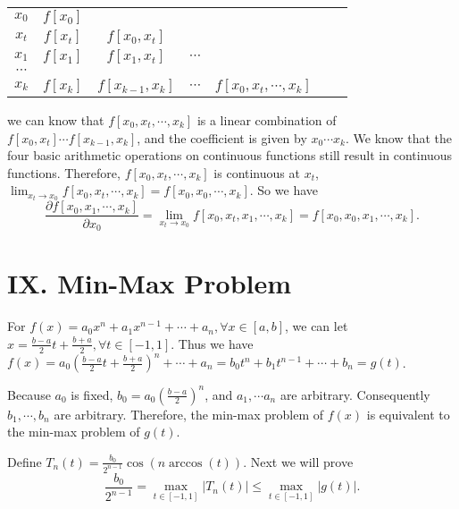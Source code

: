 \documentclass[a4paper]{article}
\begin{document}
\begin{table}[H]
  \centering
  \begin{tabular}{c|cccccc}
    $x_0$ & $f[x_0]$ &                 &                                  & & & \\
    $x_t$ & $f[x_t]$ & $f[x_0,x_t]$        &                                  & & & \\
    $x_1$ & $f[x_1]$ & $f[x_1,x_t]$& $\cdots $                      & & & \\
    $\cdots$ \\ 
    $x_k$ & $f[x_k]$ & $f[x_{k-1}, x_k]$ & $\cdots$ & $f[x_0,x_t,\cdots,x_k]$\\
  \end{tabular}
  \label{tabel::VIII.tabel1}
\end{table}
we can know that $f[x_0,x_t,\cdots,x_k]$ is a linear combination of $f[x_0,x_t]\cdots f[x_{k-1},x_k]$, and the coefficient is given by $x_0\cdots x_k$. We know that the four basic arithmetic operations on continuous functions still result in continuous functions. Therefore, $f[x_0,x_t,\cdots,x_k]$ is continuous at $x_t$, $\lim_{x_t \rightarrow x_0} f[x_0,x_t,\cdots,x_k] = f[x_0,x_0,\cdots,x_k]$. So we have
\begin{equation}
  \frac{\partial f[x_0, x_1, \cdots, x_k]}{\partial x_0} = \lim_{x_t\rightarrow x_0} f[x_0, x_t, x_1, \cdots, x_k] = f[x_0,x_0,x_1,\cdots, x_k].
\end{equation}


\section*{IX. Min-Max Problem}
For $f(x) = a_0x^n + a_1x^{n-1} + \cdots + a_n, \forall x\in[a,b]$, we can let $x = \frac{b-a}{2} t + \frac{b+a}{2}, \forall t\in[-1,1]$. Thus we have $f(x) = a_0(\frac{b-a}{2} t + \frac{b+a}{2})^n + \cdots + a_n = b_0 t^n+ b_1 t^{n-1} + \cdots + b_n = g(t)$. 

Because $a_0$ is fixed, $b_0 = a_0 (\frac{b-a}{2})^n$, and $a_1, \cdots a_n$ are arbitrary. Consequently $b_1, \cdots, b_n$ are arbitrary. Therefore, the min-max problem of $f(x)$ is equivalent to the min-max problem of $g(t)$.

Define $T_n(t) = \frac{b_0}{2^{n-1}} \cos(n\arccos(t))$. Next we will prove
\begin{equation}
  \frac{b_0}{2^{n-1}} = \max_{t\in[-1,1]} \vert T_n(t) \vert \le \max_{t\in[-1,1]} \vert g(t) \vert.
\end{equation}
\end{document}
